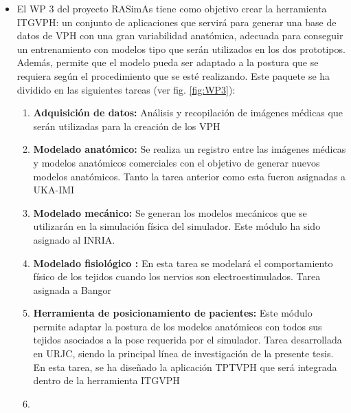 \begin{itemize}
    \item 
El \ac{WP} 3 del proyecto \ac{RASimAs} tiene como objetivo crear la herramienta \ac{ITGVPH}: un conjunto de aplicaciones que servirá para generar una base de datos de \ac{VPH} con una gran variabilidad anatómica, adecuada para conseguir un entrenamiento con modelos tipo que serán utilizados en los dos prototipos. Además, permite que el modelo pueda ser adaptado a la postura que se requiera según el procedimiento que se esté realizando. Este paquete se ha dividido en las siguientes tareas (ver fig. \ref{fig:WP3}):%
\begin{enumerate}
    \item \textbf{Adquisición de datos:} Análisis y recopilación de imágenes médicas que serán utilizadas para la creación de los \ac{VPH}
    \item \textbf{Modelado anatómico:} Se realiza un registro entre las imágenes médicas y modelos anatómicos comerciales con el objetivo de generar nuevos modelos anatómicos.
    Tanto la tarea anterior como esta fueron asignadas a \ac{UKA-IMI}
    \item \textbf{Modelado mecánico:} Se generan los modelos mecánicos que se utilizarán en la simulación física del simulador. Este módulo ha sido asignado al \ac{INRIA}.
    \item \textbf{Modelado fisiológico :} En esta tarea se modelará el comportamiento físico de los tejidos cuando los nervios son electroestimulados.
    Tarea asignada a \ac{Bangor}
    \item \textbf{Herramienta de posicionamiento de pacientes:} Este módulo permite adaptar la postura de los modelos anatómicos con todos sus tejidos asociados a la pose requerida por el simulador. Tarea desarrollada en \ac{URJC}, siendo la principal línea de investigación de la presente tesis. En esta tarea, se ha diseñado la aplicación \ac{TPTVPH} que será integrada dentro de la herramienta \ac{ITGVPH}
    \item {}
\end{enumerate}


\end{itemize}
